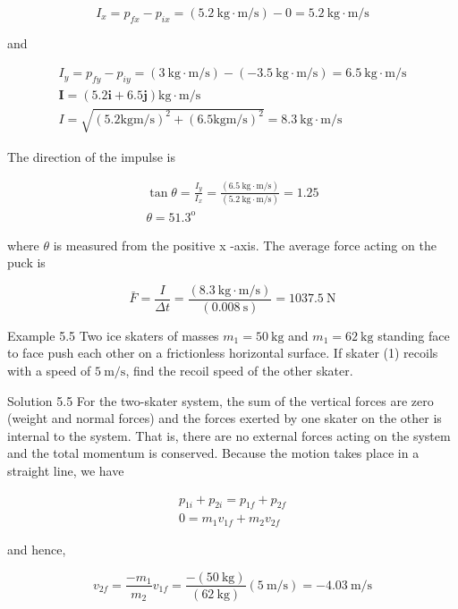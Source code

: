 \documentclass[10pt]{article}
\begin{document}
$$
I_{x}=p_{f x}-p_{i x}=(5.2 \mathrm{~kg} \cdot \mathrm{m} / \mathrm{s})-0=5.2 \mathrm{~kg} \cdot \mathrm{m} / \mathrm{s}
$$

and

$$
\begin{gathered}
I_{y}=p_{f y}-p_{i y}=(3 \mathrm{~kg} \cdot \mathrm{m} / \mathrm{s})-(-3.5 \mathrm{~kg} \cdot \mathrm{m} / \mathrm{s})=6.5 \mathrm{~kg} \cdot \mathrm{m} / \mathrm{s} \\
\mathbf{I}=(5.2 \mathbf{i}+6.5 \mathbf{j}) \mathrm{kg} \cdot \mathrm{m} / \mathrm{s} \\
I=\sqrt{(5.2 \mathrm{kgm} / \mathrm{s})^{2}+(6.5 \mathrm{kgm} / \mathrm{s})^{2}}=8.3 \mathrm{~kg} \cdot \mathrm{m} / \mathrm{s}
\end{gathered}
$$

The direction of the impulse is

$$
\begin{gathered}
\tan \theta=\frac{I_{y}}{I_{x}}=\frac{(6.5 \mathrm{~kg} \cdot \mathrm{m} / \mathrm{s})}{(5.2 \mathrm{~kg} \cdot \mathrm{m} / \mathrm{s})}=1.25 \\
\theta=51.3^{\mathrm{o}}
\end{gathered}
$$

where $\theta$ is measured from the positive x -axis. The average force acting on the puck is

$$
\bar{F}=\frac{I}{\Delta t}=\frac{(8.3 \mathrm{~kg} \cdot \mathrm{m} / \mathrm{s})}{(0.008 \mathrm{~s})}=1037.5 \mathrm{~N}
$$

Example 5.5 Two ice skaters of masses $m_{1}=50 \mathrm{~kg}$ and $m_{1}=62 \mathrm{~kg}$ standing face to face push each other on a frictionless horizontal surface. If skater (1) recoils with a speed of $5 \mathrm{~m} / \mathrm{s}$, find the recoil speed of the other skater.

Solution 5.5 For the two-skater system, the sum of the vertical forces are zero (weight and normal forces) and the forces exerted by one skater on the other is internal to the system. That is, there are no external forces acting on the system and the total momentum is conserved. Because the motion takes place in a straight line, we have

$$
\begin{gathered}
p_{1 i}+p_{2 i}=p_{1 f}+p_{2 f} \\
0=m_{1} v_{1 f}+m_{2} v_{2 f}
\end{gathered}
$$

and hence,

$$
v_{2 f}=\frac{-m_{1}}{m_{2}} v_{1 f}=\frac{-(50 \mathrm{~kg})}{(62 \mathrm{~kg})}(5 \mathrm{~m} / \mathrm{s})=-4.03 \mathrm{~m} / \mathrm{s}
$$
\end{document}
